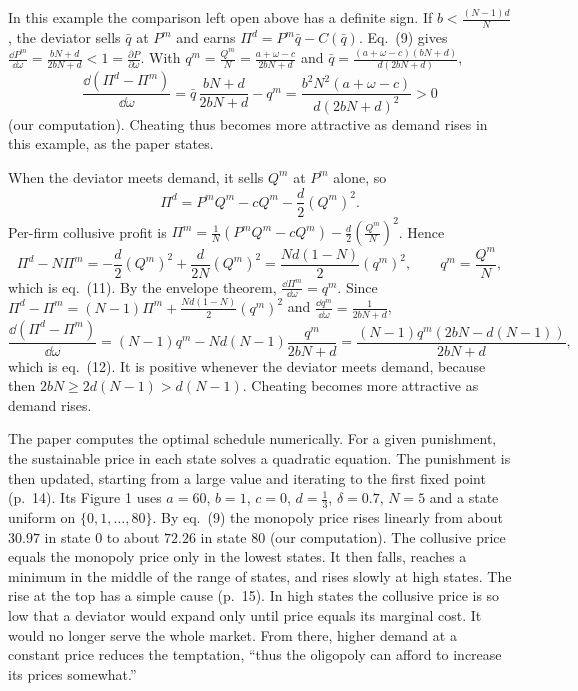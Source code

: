 In this example the comparison left open above has a definite sign. If $b < \frac{(N-1)d}{N}$, the deviator sells
$\bar q$ at $P^m$ and earns $\Pi^d = P^m\bar q - C(\bar q)$. Eq.~(9) gives $\frac{\dd P^m}{\dd\omega} = \frac{bN + d}{2bN + d} < 1 = \frac{\partial P}{\partial\omega}$. With
$q^m = \frac{Q^m}{N} = \frac{a + \omega - c}{2bN + d}$ and $\bar q = \frac{(a + \omega - c)(bN + d)}{d(2bN + d)}$,
\begin{equation*}
\frac{\dd(\Pi^d - \Pi^m)}{\dd\omega} = \bar q\,\frac{bN + d}{2bN + d} - q^m
= \frac{b^2N^2(a + \omega - c)}{d(2bN + d)^2} > 0
\end{equation*}
(our computation). Cheating thus becomes more attractive as demand rises in this example, as the paper states.

When the deviator meets demand, it sells $Q^m$ at $P^m$ alone, so
\begin{equation*}
\Pi^d = P^mQ^m - cQ^m - \frac{d}{2}(Q^m)^2 .
\end{equation*}
Per-firm collusive profit is $\Pi^m = \frac{1}{N}(P^mQ^m - cQ^m) - \frac{d}{2}\left(\frac{Q^m}{N}\right)^2$. Hence
\begin{equation*}
\Pi^d - N\Pi^m = -\frac{d}{2}(Q^m)^2 + \frac{d}{2N}(Q^m)^2 = \frac{Nd(1-N)}{2}(q^m)^2, \qquad q^m = \frac{Q^m}{N},
\end{equation*}
which is eq.~(11). By the envelope theorem, $\frac{\dd\Pi^m}{\dd\omega} = q^m$. Since $\Pi^d - \Pi^m = (N-1)\Pi^m +
\frac{Nd(1-N)}{2}(q^m)^2$ and $\frac{\dd q^m}{\dd\omega} = \frac{1}{2bN + d}$,
\begin{equation}\label{eq:12-rs-incmc}
\frac{\dd(\Pi^d - \Pi^m)}{\dd\omega} = (N-1)q^m - Nd(N-1)\frac{q^m}{2bN + d} = \frac{(N-1)q^m\left(2bN - d(N-1)\right)}{2bN + d},
\end{equation}
which is eq.~(12). It is positive whenever the deviator meets demand, because then $2bN \ge 2d(N-1) > d(N-1)$. Cheating
becomes more attractive as demand rises.

The paper computes the optimal schedule numerically. For a given punishment, the sustainable price in each state
solves a quadratic equation. The punishment is then updated, starting from a large value and iterating to the first
fixed point (p.~14). Its Figure 1 uses $a = 60$, $b = 1$, $c = 0$, $d = \frac{1}{3}$, $\delta = 0.7$, $N = 5$ and a state
uniform on $\{0, 1, \dots, 80\}$. By eq.~(9) the monopoly price rises linearly from about $30.97$ in state $0$ to about
$72.26$ in state $80$ (our computation). The collusive price equals the monopoly price only in the lowest states. It
then falls, reaches a minimum in the middle of the range of states, and rises slowly at high states. The rise at the
top has a simple cause (p.~15). In high states the collusive price is so low that a deviator would expand only until
price equals its marginal cost. It would no longer serve the whole market. From there, higher demand at a constant
price reduces the temptation, ``thus the oligopoly can afford to increase its prices somewhat.''

